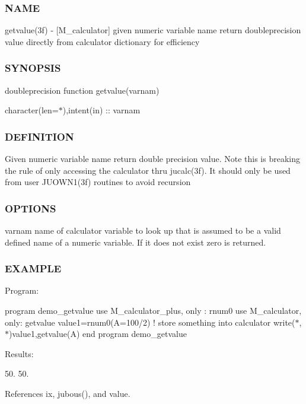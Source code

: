 \subsubsection*{N\+A\+ME}

getvalue(3f) -\/ \mbox{[}M\+\_\+calculator\mbox{]} given numeric variable name return doubleprecision value directly from calculator dictionary for efficiency \subsubsection*{S\+Y\+N\+O\+P\+S\+IS}

doubleprecision function getvalue(varnam)

character(len=$\ast$),intent(in) \+:\+: varnam

\subsubsection*{D\+E\+F\+I\+N\+I\+T\+I\+ON}

Given numeric variable name return double precision value. Note this is breaking the rule of only accessing the calculator thru jucalc(3f). It should only be used from user J\+U\+O\+W\+N1(3f) routines to avoid recursion \subsubsection*{O\+P\+T\+I\+O\+NS}

varnam name of calculator variable to look up that is assumed to be a valid defined name of a numeric variable. If it does not exist zero is returned. \subsubsection*{E\+X\+A\+M\+P\+LE}

Program\+:

program demo\+\_\+getvalue use M\+\_\+calculator\+\_\+plus, only \+: rnum0 use M\+\_\+calculator, only\+: getvalue value1=rnum0(\textquotesingle{}A=100/2\textquotesingle{}) ! store something into calculator write($\ast$,$\ast$)value1,getvalue(\textquotesingle{}A\textquotesingle{}) end program demo\+\_\+getvalue

Results\+:

50. 50. 

References ix, jubous(), and value.

